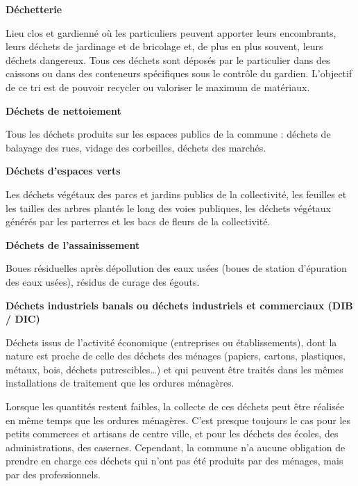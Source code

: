 \vspace{0.3cm}
\textbf{Déchetterie}
\vspace{0.3cm}

Lieu clos et gardienné où les particuliers peuvent apporter leurs encombrants, leurs déchets de jardinage et de bricolage et, de plus en plus souvent, leurs déchets dangereux. Tous ces déchets sont déposés par le particulier dans des caissons ou dans des conteneurs spécifiques sous le contrôle du gardien. L’objectif de ce tri est de pouvoir recycler ou valoriser le maximum de matériaux.

\vspace{0.3cm} 
\textbf{Déchets de nettoiement}
\vspace{0.3cm}

Tous les déchets produits sur les espaces publics de la commune : déchets de balayage des rues, vidage des corbeilles, déchets des marchés.

\vspace{0.3cm}
\textbf{Déchets d’espaces verts}
\vspace{0.3cm}

Les déchets végétaux des parcs et jardins publics de la collectivité, les feuilles et les tailles des arbres plantés le long des voies publiques, les déchets végétaux générés par les parterres et les bacs de fleurs de la collectivité.

\vspace{0.3cm}
\textbf{Déchets de l’assainissement}
\vspace{0.3cm}

Boues résiduelles après dépollution des eaux usées (boues de station d’épuration des eaux usées), résidus de curage des égouts.

\vspace{0.3cm}
\textbf{Déchets industriels banals ou déchets industriels et commerciaux (DIB / DIC)}
\vspace{0.3cm}



Déchets issus de l’activité économique (entreprises ou établissements), dont la nature est proche de celle des déchets des ménages (papiers, cartons, plastiques, métaux, bois, déchets putrescibles…) et qui peuvent être traités dans les mêmes installations de traitement que les ordures ménagères.

\vspace{0.3cm}

Lorsque les quantités restent faibles, la collecte de ces déchets peut être réalisée en même temps que les ordures ménagères. C’est presque toujours le cas pour les petits commerces et artisans de centre ville, et pour les déchets des écoles, des administrations, des casernes. Cependant, la commune n’a aucune obligation de prendre en charge ces déchets qui n’ont pas été produits par des ménages, mais par des professionnels.

